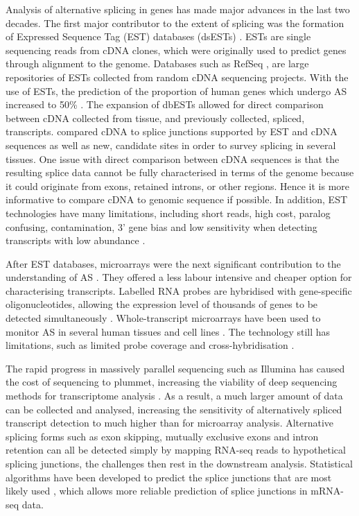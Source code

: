 \documentclass[12pt]{article}
\begin{document}
				
			Analysis of alternative splicing in genes has made major advances in the last two decades.
			The first major contributor to the extent of splicing was the formation of Expressed Sequence Tag (EST) databases (dsESTs) \citep{Parkinson09}.
			ESTs are single sequencing reads from cDNA clones, which were originally used to predict genes through alignment to the genome.
			Databases such as RefSeq \citep{Pruitt14}, are large repositories of ESTs collected from random cDNA sequencing projects. 
			With the use of ESTs, the prediction of the proportion of human genes which undergo AS increased to 50\% \citep{Kan01,Brett02}.
			The expansion of dbESTs allowed for direct comparison between cDNA collected from tissue, and previously collected, spliced, transcripts.
			\citet{Pan08} compared cDNA to splice junctions supported by EST and cDNA sequences as well as new, candidate sites in order to survey splicing in several tissues.
			One issue with direct comparison between cDNA sequences is that the resulting splice data cannot be fully characterised in terms of the genome because it could originate from exons, retained introns, or other regions. 
			Hence it is more informative to compare cDNA to genomic sequence if possible. 
			In addition, EST technologies have many limitations, including short reads, high cost, paralog confusing, contamination, 3' gene bias and low sensitivity when detecting transcripts with low abundance \citep{Lewis03, Florea06, Wang10}.
			
			After EST databases, microarrays were the next significant contribution to the understanding of AS \citep{Johnson03}.
			They offered a less labour intensive and cheaper option for characterising transcripts.
			Labelled RNA probes are hybridised with gene-specific oligonucleotides, allowing the expression level of thousands of genes to be detected simultaneously \citep{Hu01, Wang03}. 
			Whole-transcript microarrays have been used to monitor AS in several human tissues and cell lines \citep{Castle08}.
			The technology still has limitations, such as limited probe coverage and cross-hybridisation \citep{Wang10}. 
			
			The rapid progress in massively parallel sequencing such as Illumina \citep{Valencia13} has caused the cost of sequencing to plummet, increasing the viability of deep sequencing methods for transcriptome analysis \citep{Blencojkwe09}.
			As a result, a much larger amount of data can be collected and analysed, increasing the sensitivity of alternatively spliced transcript detection to much higher than for microarray analysis.
			Alternative splicing forms such as exon skipping, mutually exclusive exons and intron retention can all be detected simply by mapping RNA-seq reads to hypothetical splicing junctions, the challenges then rest in the downstream analysis.
			Statistical algorithms have been developed to predict the splice junctions that are most likely used \citep{Wang10}, which allows more reliable prediction of splice junctions in mRNA-seq data. 
			
\end{document}
